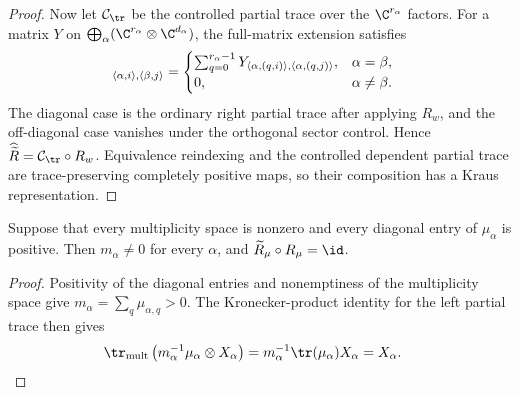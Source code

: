 \begin{proof}
    Now let $\mathcal C_{\tr}$ be the controlled partial trace over
    the $\C^{r_\alpha}$ factors. For a matrix $Y$ on
    $\bigoplus_\alpha(\C^{r_\alpha}\otimes\C^{d_\alpha})$,
    the full-matrix extension satisfies
    \begin{align}
        [\widehat{\widetilde R}(Y)]_{\langle\alpha,i\rangle,
                \langle\beta,j\rangle}
         & =
        \begin{cases}
            \sum_{q=0}^{r_\alpha-1}
            Y_{\langle\alpha,(q,i)\rangle,\langle\alpha,(q,j)\rangle},
               & \alpha=\beta,   \\
            0, & \alpha\ne\beta.
        \end{cases}
        \notag
    \end{align}
    The diagonal case is the ordinary right partial trace after applying
    $R_w$, and the off-diagonal case vanishes under the orthogonal sector
    control. Hence
    $\widehat{\widetilde R}=\mathcal C_{\tr}\circ R_w$.
    Equivalence reindexing and the controlled dependent partial trace are
    trace-preserving completely positive maps, so their composition has a
    Kraus representation.
\end{proof}

\begin{lemma}
    \label{lem:mpdo_vertical_sector_retraction}
    \leanok
    Suppose that every multiplicity space is nonzero and every diagonal
    entry of $\mu_\alpha$ is positive. Then $m_\alpha\ne0$ for every
    $\alpha$, and $\widetilde R_\mu\circ R_\mu=\id$.
\end{lemma}

\begin{proof}\leanok
    Positivity of the diagonal entries and nonemptiness of the multiplicity
    space give $m_\alpha=\sum_q\mu_{\alpha,q}>0$. The Kronecker-product
    identity for the left partial trace then gives
    \begin{align}
        \tr_{\mathrm{mult}}
        \left(m_\alpha^{-1}\mu_\alpha\otimes X_\alpha\right)
         & =m_\alpha^{-1}\tr(\mu_\alpha)X_\alpha
        =X_\alpha.
        \notag
    \end{align}
\end{proof}

